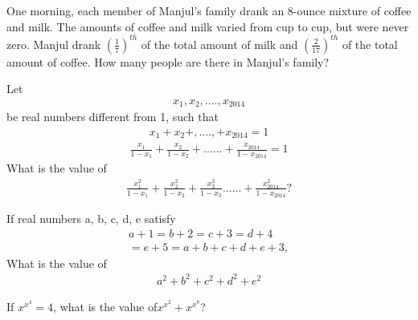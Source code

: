 \item One morning, each member of Manjul's family drank an 8-ounce mixture of coffee and milk. The amounts of coffee and milk varied from cup to cup, but were never zero. Manjul drank $(\frac{1}{7})^{th}$ of the total amount of milk and 
$(\frac{2}{17})^{th}$ of the total amount of coffee. How many people are there in Manjul's family?

\item Let 
\begin{align*}
x_{1}, x_{2},....,x_{2014}
\end{align*}
be real numbers different from 1, such that 
\begin{align*}
x_{1} + x_{2} +,....,+ x_{2014} = 1
\end{align*} 
\begin{align*}
\frac{x_1}{1 - x_1} + \frac{x_2}{1 - x_2} +...... + \frac{x_{2014}}{1 - x_{2014}} = 1
\end{align*}
What is the value of  
\begin{align*}
\frac{x_1^2}{1 - x_1} + \frac{x_2^2}{1 - x_2} + \frac{x_3^2}{1 - x_3}...... + \frac{x^2_{2014}}{1 - x_{2014}}?
\end{align*}

\item If real numbers a, b, c, d, e satisfy 
\begin{align*}
a + 1 = b + 2 = c + 3 = d + 4 \\= e + 5 = a + b + c + d + e + 3,
\end{align*}
What is the value of 
\begin{align*}
a^2 + b^2 + c^2 + d^2 + e^2
\end{align*}


\item If $x^{x^{4}} = 4$, what is the value of$x^{x^{2}} + x^{x^{8}}$?



